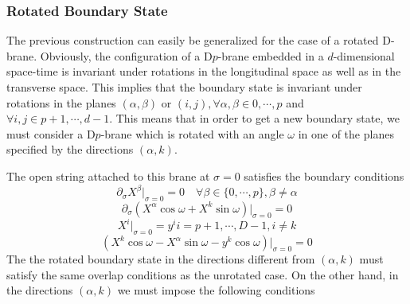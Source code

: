 \subsubsection{Rotated Boundary State}
The previous construction can easily be generalized for the case of a rotated D-brane. Obviously, the configuration of a D$p$-brane embedded in a $d$-dimensional space-time is invariant under rotations in the longitudinal space as well as in the transverse space. This implies that the boundary state is invariant under rotations in the planes $(\alpha,\beta)$ or $(i,j), \forall \alpha,\beta\in{0,\cdots,p}$ and $\forall i,j \in {p+1,\cdots,d-1}$. This means that in order to get a new boundary state, we must consider a D$p$-brane which is rotated with an angle $\omega$ in one of the planes specified by the directions $(\alpha,k)$.
\par The open string attached to this brane at $\sigma = 0$ satisfies the boundary conditions 
\begin{equation}
\partial_\sigma X^\beta\vert_{\sigma=0} = 0 \quad \forall \beta\in \{0,\cdots,p\},\beta\neq\alpha
\end{equation}
\begin{equation}
\partial_\sigma(X^\alpha \cos\omega + X^k\sin\omega)\vert_{\sigma=0} = 0
\end{equation}
\begin{equation}
X^i\vert_{\sigma=0} = y^i i = p+1,\cdots,D-1, i\neq k
\end{equation}
\begin{equation}
(X^k\cos\omega - X^\alpha\sin\omega - y^k\cos\omega)\vert_{\sigma=0} = 0
\end{equation}
The the rotated boundary state in the directions different from $(\alpha,k)$ must satisfy the same overlap conditions as the unrotated case. On the other hand, in the directions $(\alpha,k)$ we must impose the following conditions

